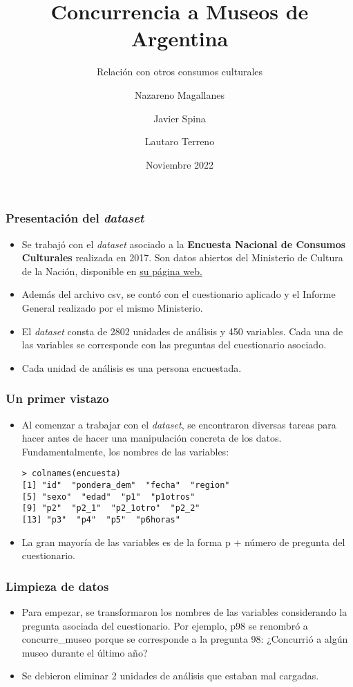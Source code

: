 \documentclass{beamer}
\title{Concurrencia a Museos de Argentina}
\subtitle{Relación con otros consumos culturales}
\author{Nazareno Magallanes \and Javier Spina \and Lautaro Terreno}
\institute[ECyT]
{
  Escuela de Ciencia y Tecnología
  \and
  Universidad Nacional de San Martín
}
\date{Noviembre 2022}
\begin{document}
\frame{\titlepage}

\begin{frame}
\frametitle{Presentación del \textit{dataset}}

\begin{itemize}
\item<1-> Se trabajó con el \textit{dataset} asociado a la \textbf{Encuesta Nacional de Consumos Culturales} realizada en 2017. Son datos abiertos del Ministerio de Cultura de la Nación, disponible en \href{https://datos.cultura.gob.ar/dataset/encuesta-nacional-de-consumos-culturales-2017}{su página web.}
\item<2-> Además del archivo csv, se contó con el cuestionario aplicado y el Informe General realizado por el mismo Ministerio.
\item<3->El \textit{dataset} consta de 2802 unidades de análisis y 450 variables. Cada una de las variables se corresponde con las preguntas del cuestionario asociado.
\item <4->Cada unidad de análisis es una persona encuestada.
\end{itemize}

\end{frame}

\begin{frame}[fragile]
\frametitle{Un primer vistazo}

\begin{itemize}
\item<1->Al comenzar a trabajar con el \textit{dataset}, se encontraron diversas tareas para hacer antes de hacer una manipulación concreta de los datos. Fundamentalmente, los nombres de las variables: 

\begin{lstlisting}
> colnames(encuesta)
[1] "id"  "pondera_dem"  "fecha"  "region"
[5] "sexo"  "edad"  "p1"  "p1otros"
[9] "p2"  "p2_1"  "p2_1otro"  "p2_2"
[13] "p3"  "p4"  "p5"  "p6horas"
\end{lstlisting}

\item<2->La gran mayoría de las variables es de la forma p + número de pregunta del cuestionario.
\end{itemize}

\end{frame}

\begin{frame}
\frametitle{Limpieza de datos}

\begin{itemize}
\item<1-> Para empezar, se transformaron los nombres de las variables considerando la pregunta asociada del cuestionario. Por ejemplo, p98 se renombró a concurre\_museo porque se corresponde a la pregunta 98: ¿Concurrió a algún museo durante el último año?
\item<2-> Se debieron eliminar 2 unidades de análisis que estaban mal cargadas.
\end{itemize}

\end{frame}
\end{document}
